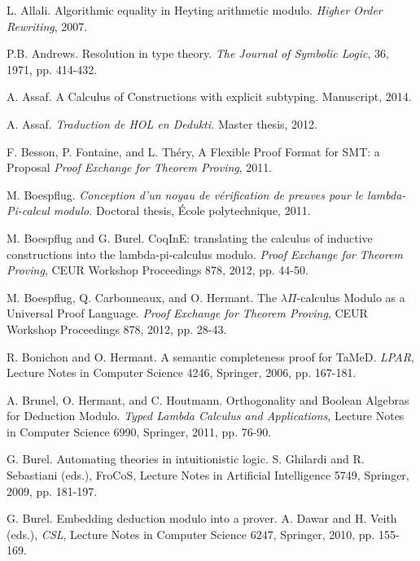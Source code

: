 \documentclass{llncs}
\begin{document}


\begin{thebibliography}{99.}
L. Allali.
Algorithmic equality in Heyting arithmetic modulo.
{\em Higher Order Rewriting}, 2007.

P.B. Andrews. 
Resolution in type theory.
{\em The Journal of Symbolic Logic}, 36, 1971, pp. 414-432.

A. Assaf. 
A Calculus of Constructions with explicit subtyping.
Manuscript, 2014.

A. Assaf. 
{\em Traduction de HOL en Dedukti.}
Master thesis, 2012. 

F. Besson, P. Fontaine, and L. Th\'ery, 
A Flexible Proof Format for SMT: a Proposal 
{\em Proof Exchange for Theorem Proving}, 2011. 

M. Boespflug. 
{\em Conception d'un noyau de v\'erification de preuves pour le 
lambda-Pi-calcul modulo.}
Doctoral thesis, \'Ecole polytechnique, 2011. 

M. Boespflug and G. Burel. 
CoqInE: translating the calculus of inductive constructions into the 
lambda-pi-calculus modulo. 
{\em Proof Exchange for 
Theorem Proving}, CEUR Workshop Proceedings 878, 2012, pp. 44-50.

M. Boespflug, Q. Carbonneaux, and O. Hermant.
The $\lambda \Pi$-calculus Modulo as a Universal Proof Language.
{\em Proof Exchange for Theorem Proving}, CEUR Workshop Proceedings 878, 
2012, pp. 28-43.

R. Bonichon and O. Hermant.
A semantic completeness proof for TaMeD.
{\em LPAR}, Lecture Notes in Computer  Science 4246, Springer, 2006,
pp. 167-181.

A. Brunel, O. Hermant, and C. Houtmann.
Orthogonality and Boolean Algebras for Deduction Modulo.
{\em Typed Lambda Calculus and Applications}, 
Lecture Notes in Computer Science 6990, Springer, 2011, pp. 76-90. 

G. Burel. Automating theories in intuitionistic logic. S. Ghilardi and R. 
Sebastiani (eds.), FroCoS, Lecture Notes in Artificial Intelligence
5749, Springer, 2009, pp. 181-197.

G. Burel.
Embedding deduction modulo into a prover.
A. Dawar and H. Veith (eds.), {\em CSL}, 
Lecture Notes in Computer Science 6247, Springer, 2010, pp. 155-169. 


\end{thebibliography}
\end{document}

